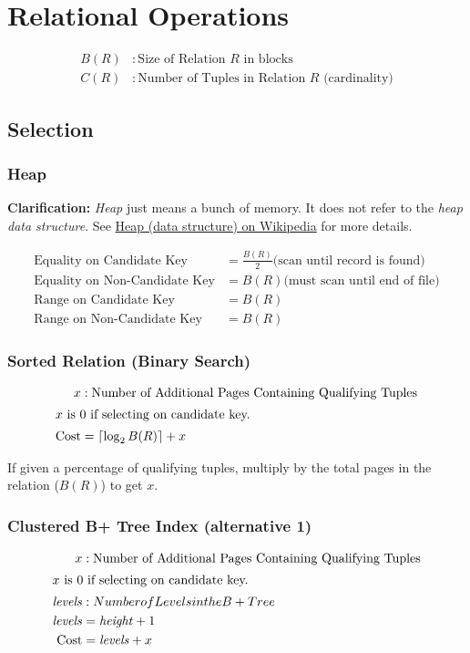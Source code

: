 \documentclass{article}
\newcommand{\ceil}[1]{\left\lceil#1\right\rceil}
\begin{document}
\section{Relational Operations}

\begin{align*}
  B(R) &: \text{Size of Relation \(R\) in blocks} \\
  C(R) &: \text{Number of Tuples in Relation \(R\) (cardinality)}
\end{align*}

\subsection{Selection}

\subsubsection{Heap}

\textbf{Clarification:} \textit{Heap} just means a bunch of memory. It
does not refer to the \textit{heap data structure}. See
\href{http://en.wikipedia.org/wiki/Heap\_(data\_structure)}{Heap (data
  structure) on Wikipedia} for more details.

\begin{align}
  \text{Equality on Candidate Key} &= \frac{B(R)}{2} \text{(scan until record is found)} \\
  \text{Equality on Non-Candidate Key} &= B(R) \text{(must scan until end of file)} \\
  \text{Range on Candidate Key} &= B(R) \\
  \text{Range on Non-Candidate Key} &= B(R)
\end{align}

\subsubsection{Sorted Relation (Binary Search)}

\begin{align}
  x &: \text{Number of Additional Pages Containing Qualifying Tuples} \notag \\
  \intertext{\(x\) is 0 if selecting on candidate key.}
  \text{Cost} &= \ceil{\log_2B(R)} + x
\end{align}

If given a percentage of qualifying tuples, multiply by the total pages in the relation (\(B(R)\)) to get \(x\).

\subsubsection{Clustered B+ Tree Index (alternative 1)}

\begin{align}
  x &: \text{Number of Additional Pages Containing Qualifying Tuples} \notag \\
  \intertext{\(x\) is 0 if selecting on candidate key.}
  \mathit{levels} &: Number of Levels in the B+ Tree \\
  \mathit{levels} &= \mathit{height} + 1 \\
  \text{Cost} &= \mathit{levels} + x
\end{align}
\end{document}
